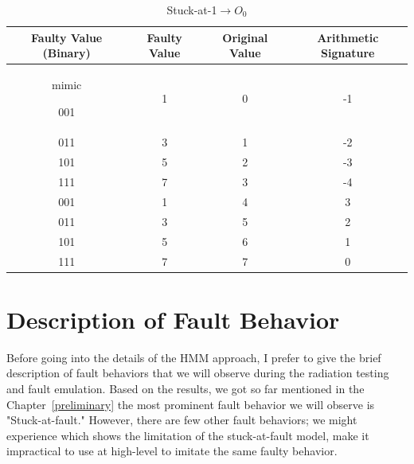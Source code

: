 \begin{table}[tb!]
\center
\caption{Stuck-at-1$\rightarrow O_0$}

\label{s@1-O0}

\begin{tabular}{|c | c| c | c| } 
 \hline
 \rowcolor{lightgray}
Faulty Value (Binary) & Faulty Value & Original Value & Arithmetic Signature   \\ 
\hline
mimic
 
 
 001& 1 &0 & -1  \\
 \hline
 011 & 3 & 1 & -2 \\ 
 \hline
 
 101 & 5 & 2 & -3 \\
 \hline
 111& 7& 3& -4 \\
 \hline
 001 & 1  &  4& 3 \\
 \hline
 011 & 3 & 5 &2  \\
 \hline
 101 & 5 & 6 & 1 \\
 \hline
 111 & 7 & 7 & 0 \\
 \hline
 
 
\end{tabular}
\end{table}

\section{Description of Fault Behavior}

Before going into the details of the HMM approach, I prefer to give the brief description of fault behaviors that we will observe during the radiation testing and fault emulation. Based on the results, we got so far mentioned in the Chapter~\ref{preliminary} the most prominent fault behavior we will observe is "Stuck-at-fault." However, there are few other fault behaviors; we might experience which shows the limitation of the stuck-at-fault model, make it impractical to use at high-level to imitate the same faulty behavior.

